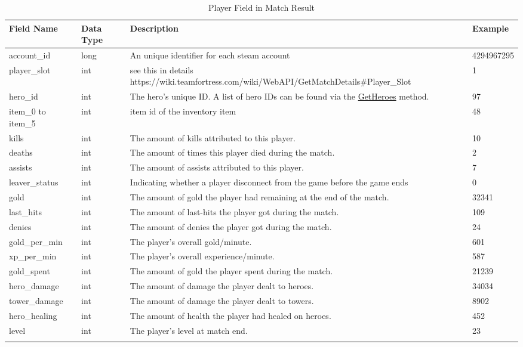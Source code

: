 \documentclass{article}
\begin{document}
\begin{longtable}{|p{3cm}|p{2cm}|p{5cm}|p{3cm}|}

\hline
\textbf{Field Name} & \textbf{Data Type} & \textbf{Description}  & \textbf{Example} \\
\hline
\endhead

account\_id & long & An unique identifier for each steam account & 4294967295 \\
\hline
player\_slot & int & see this in details https://wiki.teamfortress.com/wiki/WebAPI/GetMatchDetails\#Player\_Slot & 1 \\
\hline
hero\_id & int & The hero's unique ID. A list of hero IDs can be found via the \href{https://wiki.teamfortress.com/wiki/WebAPI/GetHeroes}{GetHeroes} method. & 97 \\
\hline
item\_0 to item\_5 & int & item id of the inventory item & 48 \\
\hline
kills & int & The amount of kills attributed to this player. & 10 \\
\hline
deaths & int & The amount of times this player died during the match. & 2 \\
\hline
assists & int & The amount of assists attributed to this player. & 7 \\
\hline
leaver\_status & int & Indicating whether a player disconnect from the game before the game ends & 0 \\
\hline
gold & int & The amount of gold the player had remaining at the end of the match. & 32341 \\
\hline
last\_hits & int & The amount of last-hits the player got during the match. & 109 \\
\hline
denies & int & The amount of denies the player got during the match. & 24 \\
\hline
gold\_per\_min & int &  The player's overall gold/minute. & 601 \\
\hline
xp\_per\_min & int & The player's overall experience/minute. & 587 \\
\hline
gold\_spent & int & The amount of gold the player spent during the match. & 21239 \\
\hline
hero\_damage & int & The amount of damage the player dealt to heroes. & 34034 \\
\hline
tower\_damage & int & The amount of damage the player dealt to towers. & 8902 \\
\hline
hero\_healing & int & The amount of health the player had healed on heroes. & 452 \\
\hline
level & int & The player's level at match end. & 23 \\
\hline
\caption{Player Field in Match Result}
\end{longtable}
\label{player-field-in-match-result}
\end{document}
